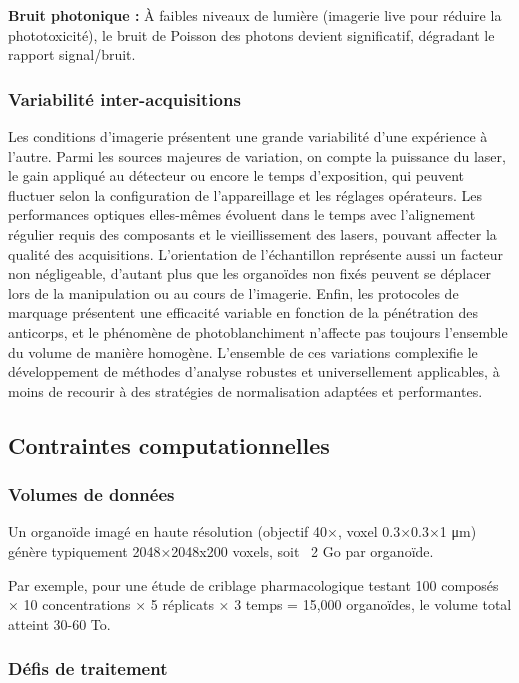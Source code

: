 \textbf{Bruit photonique :}
À faibles niveaux de lumière (imagerie live pour réduire la phototoxicité), le bruit de Poisson des photons devient significatif, dégradant le rapport signal/bruit.

\subsubsection{Variabilité inter-acquisitions}

Les conditions d'imagerie présentent une grande variabilité d'une expérience à l'autre. Parmi les sources majeures de variation, on compte la puissance du laser, le gain appliqué au détecteur ou encore le temps d’exposition, qui peuvent fluctuer selon la configuration de l’appareillage et les réglages opérateurs. Les performances optiques elles-mêmes évoluent dans le temps avec l’alignement régulier requis des composants et le vieillissement des lasers, pouvant affecter la qualité des acquisitions. L’orientation de l’échantillon représente aussi un facteur non négligeable, d’autant plus que les organoïdes non fixés peuvent se déplacer lors de la manipulation ou au cours de l’imagerie. Enfin, les protocoles de marquage présentent une efficacité variable en fonction de la pénétration des anticorps, et le phénomène de photoblanchiment n’affecte pas toujours l’ensemble du volume de manière homogène. L’ensemble de ces variations complexifie le développement de méthodes d’analyse robustes et universellement applicables, à moins de recourir à des stratégies de normalisation adaptées et performantes.

\subsection{Contraintes computationnelles}

\subsubsection{Volumes de données}

Un organoïde imagé en haute résolution (objectif 40×, voxel 0.3×0.3×1 μm) génère typiquement 2048×2048x200 voxels, soit ~2 Go par organoïde.

Par exemple, pour une étude de criblage pharmacologique testant 100 composés × 10 concentrations × 5 réplicats × 3 temps = 15,000 organoïdes, le volume total atteint 30-60 To.

\subsubsection{Défis de traitement}

